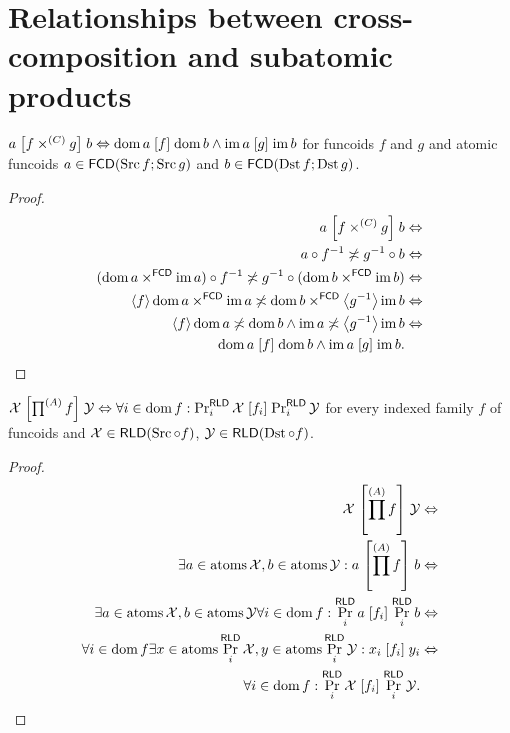 \section{Relationships between cross-composition and subatomic products}
\begin{prop}
$a\mathrel{\left[f\times^{(C)}g\right]}b\Leftrightarrow\operatorname{dom} a\mathrel{\left[f\right]}\operatorname{dom} b\wedge\operatorname{im} a\mathrel{\left[g\right]}\operatorname{im} b$
for funcoids $f$ and $g$ and atomic funcoids $a\in\mathsf{FCD}(\operatorname{Src} f;\operatorname{Src} g)$
and $b\in\mathsf{FCD}(\operatorname{Dst} f;\operatorname{Dst} g)$.\end{prop}
\begin{proof}
~
\begin{align*}
a\mathrel{\left[f\times^{(C)}g\right]}b & \Leftrightarrow\\
a\circ f^{-1}\not\asymp g^{-1}\circ b & \Leftrightarrow\\
(\operatorname{dom} a\times^{\mathsf{FCD}}\operatorname{im} a)\circ f^{-1}\not\asymp g^{-1}\circ(\operatorname{dom} b\times^{\mathsf{FCD}}\operatorname{im} b) & \Leftrightarrow\\
\left\langle f\right\rangle\operatorname{dom} a\times^{\mathsf{FCD}}\operatorname{im} a\not\asymp\operatorname{dom} b\times^{\mathsf{FCD}}\left\langle g^{-1}\right\rangle\operatorname{im} b & \Leftrightarrow\\
\left\langle f\right\rangle\operatorname{dom} a\not\asymp\operatorname{dom} b\land\operatorname{im} a\not\asymp\left\langle g^{-1}\right\rangle\operatorname{im} b & \Leftrightarrow\\
\operatorname{dom} a\mathrel{\left[f\right]}\operatorname{dom} b\wedge\operatorname{im} a\mathrel{\left[g\right]}\operatorname{im} b.
\end{align*}
\end{proof}
\begin{prop}
$\mathcal{X}\mathrel{\left[\prod^{(A)}f\right]}\mathcal{Y}\Leftrightarrow\forall i\in\operatorname{dom} f:\Pr_{i}^{\mathsf{RLD}}\mathcal{X}\mathrel{\left[f_{i}\right]}\Pr_{i}^{\mathsf{RLD}}\mathcal{Y}$
for every indexed family $f$ of funcoids and $\mathcal{X}\in\mathsf{RLD}(\operatorname{Src}\circ f)$,
$\mathcal{Y}\in\mathsf{RLD}(\operatorname{Dst}\circ f)$.\end{prop}
\begin{proof}
~
\begin{align*}
\mathcal{X}\mathrel{\left[\prod^{(A)}f\right]}\mathcal{Y} & \Leftrightarrow\\
\exists a\in\operatorname{atoms}\mathcal{X},b\in\operatorname{atoms}\mathcal{Y}:a\mathrel{\left[\prod^{(A)}f\right]}b & \Leftrightarrow\\
\exists a\in\operatorname{atoms}\mathcal{X},b\in\operatorname{atoms}\mathcal{Y}\forall i\in\operatorname{dom} f:\Pr_{i}^{\mathsf{RLD}}a\mathrel{\left[f_{i}\right]}\Pr_{i}^{\mathsf{RLD}}b & \Leftrightarrow\\
\forall i\in\operatorname{dom} f\exists x\in\operatorname{atoms}\Pr_{i}^{\mathsf{RLD}}\mathcal{X},y\in\operatorname{atoms}\Pr_{i}^{\mathsf{RLD}}\mathcal{Y}:x_{i}\mathrel{\left[f_{i}\right]}y_{i} & \Leftrightarrow\\
\forall i\in\operatorname{dom} f:\Pr_{i}^{\mathsf{RLD}}\mathcal{X}\mathrel{\left[f_{i}\right]}\Pr_{i}^{\mathsf{RLD}}\mathcal{Y}.
\end{align*}
\end{proof}
